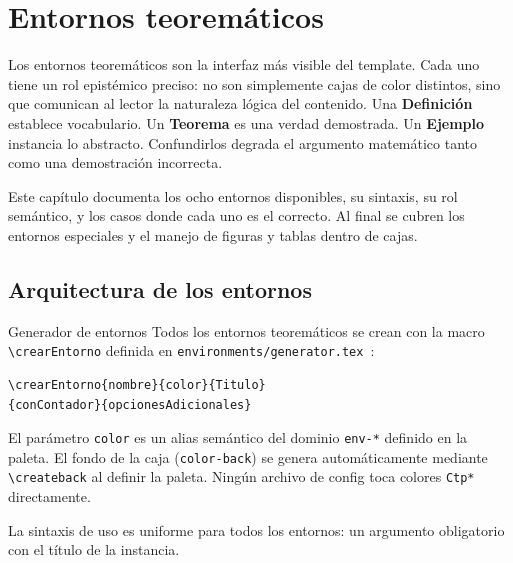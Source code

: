 \chapter{Entornos teoremáticos}
\label{ch:entornos}

Los entornos teoremáticos son la interfaz más visible del template. Cada
uno tiene un rol epistémico preciso: no son simplemente cajas de color
distintos, sino que comunican al lector la naturaleza lógica del contenido.
Una \textbf{Definición} establece vocabulario. Un \textbf{Teorema} es una
verdad demostrada. Un \textbf{Ejemplo} instancia lo abstracto. Confundirlos
degrada el argumento matemático tanto como una demostración incorrecta.

Este capítulo documenta los ocho entornos disponibles, su sintaxis, su rol
semántico, y los casos donde cada uno es el correcto. Al final se cubren los
entornos especiales y el manejo de figuras y tablas dentro de cajas.

\section{Arquitectura de los entornos}
\label{sec:entornos-arquitectura}

\begin{definicion}{Generador de entornos}
\label{def:generador}
Todos los entornos teoremáticos se crean con la macro
\texttt{\textbackslash crearEntorno} definida en
\texttt{environments/generator.tex}~\cite{tcolorbox2024b}:
\begin{lstlisting}[style=latex, frame=none, numbers=none]
\crearEntorno{nombre}{color}{Titulo}
{conContador}{opcionesAdicionales}
\end{lstlisting}
El parámetro \texttt{color} es un alias semántico del dominio \texttt{env-*}
definido en la paleta. El fondo de la caja (\texttt{color-back}) se genera
automáticamente mediante \texttt{\textbackslash createback} al definir la paleta.
Ningún archivo de config toca colores \texttt{Ctp*} directamente.
\end{definicion}

La sintaxis de uso es uniforme para todos los entornos: un argumento
obligatorio con el título de la instancia.

